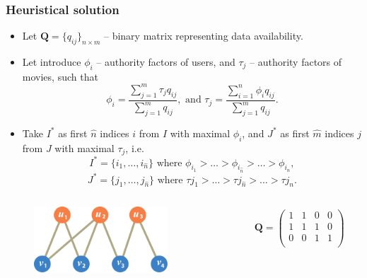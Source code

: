 \documentclass{beamer}
\newcommand{\mQ}{\mathbf{Q}}
\begin{document}
\begin{frame}
\frametitle{Heuristical solution}
\begin{itemize}
  \item Let $\mQ = \{q_{ij}\}_{n \times m}$ -- binary matrix representing data
  availability.
  \item Let introduce $\phi_{i}$ -- authority factors of users, and $\tau_{j}$
  -- authority factors of movies, such that
  \begin{equation*}
\phi_{i}  = \frac{\sum\limits_{j = 1}^m\tau_{j}
  q_{ij}}{\sum\limits_{j=1}^m q_{ij}},
\text{ and }
\tau_{j}  = \frac{\sum\limits_{i = 1}^n\phi_{i} q_{ij}}{\sum\limits_{j=1}^m
q_{ij}}.  
  \end{equation*}
  \item Take $I^*$ as first $\hat{n}$  indices $i$ from $I$ with maximal
  $\phi_i$, and $J^*$ as first $\hat{m}$  indices $j$ from $J$ with maximal
  $\tau_j$, i.e.
  \begin{equation*}
  I^* = \{i_1, \ldots, i_{\hat{n}}\} \text{ where } \phi_{i_1}  > \ldots > \phi_{i_{\hat{n}}} >
 \ldots > \phi_{i_{n}}, 
  \end{equation*}
  \begin{equation*}
  J^* = \{j_1, \ldots, j_{\hat{n}}\} \text{ where } \tau{j_1}  > \ldots >
  \tau{j_{\hat{n}}} > \ldots > \tau{j_{n}}.
  \end{equation*}  
  
\end{itemize}
\end{frame}








\begin{frame}
\begin{columns}[T] %
\begin{column}{.48\textwidth}
\begin{figure}[h] 
    \includegraphics[width=5cm]{DemoGraphQ.pdf}
\end{figure}
\end{column}%
\hfill%
\begin{column}{.48\textwidth}
\begin{eqnarray*}
\mQ = 
\left(
 \begin{array}{cccc}
    1& 1& 0& 0\\
    1& 1& 1& 0\\
    0& 0& 1& 1\\
  \end{array}
   \right)
\end{eqnarray*}
\end{column}%
\end{columns}
\end{frame}
\end{document}
